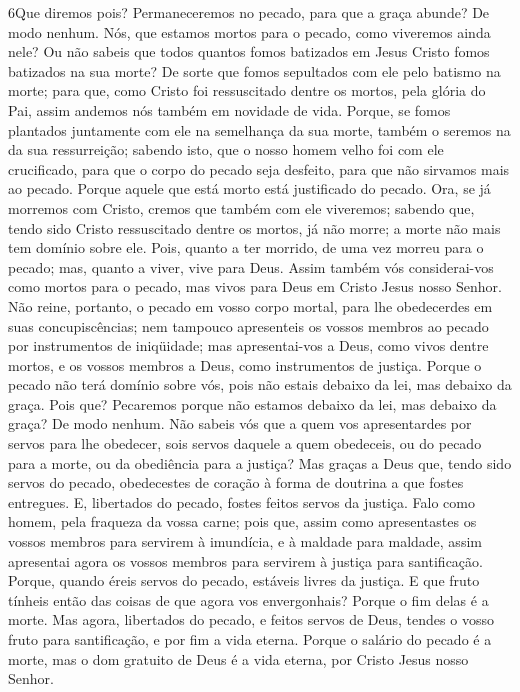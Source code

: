 \medskip

\lettrine{6} Que diremos pois? Permaneceremos no pecado, para
que a graça abunde? De modo nenhum. Nós, que estamos mortos para
o pecado, como viveremos ainda nele? Ou não sabeis que todos
quantos fomos batizados em Jesus Cristo fomos batizados na sua
morte? De sorte que fomos sepultados com ele pelo batismo na
morte; para que, como Cristo foi ressuscitado dentre os mortos, pela
glória do Pai, assim andemos nós também em novidade de vida.
Porque, se fomos plantados juntamente com ele na semelhança da
sua morte, também o seremos na da sua ressurreição; sabendo
isto, que o nosso homem velho foi com ele crucificado, para que o
corpo do pecado seja desfeito, para que não sirvamos mais ao pecado.
Porque aquele que está morto está justificado do pecado.
Ora, se já morremos com Cristo, cremos que também com ele
viveremos; sabendo que, tendo sido Cristo ressuscitado dentre os
mortos, já não morre; a morte não mais tem domínio sobre ele.
Pois, quanto a ter morrido, de uma vez morreu para o pecado;
mas, quanto a viver, vive para Deus. Assim também vós
considerai-vos como mortos para o pecado, mas vivos para Deus em
Cristo Jesus nosso Senhor. Não reine, portanto, o pecado em
vosso corpo mortal, para lhe obedecerdes em suas concupiscências;
nem tampouco apresenteis os vossos membros ao pecado por
instrumentos de iniqüidade; mas apresentai-vos a Deus, como vivos
dentre mortos, e os vossos membros a Deus, como instrumentos de
justiça. Porque o pecado não terá domínio sobre vós, pois não
estais debaixo da lei, mas debaixo da graça. Pois que?
Pecaremos porque não estamos debaixo da lei, mas debaixo da graça?
De modo nenhum. Não sabeis vós que a quem vos apresentardes
por servos para lhe obedecer, sois servos daquele a quem obedeceis,
ou do pecado para a morte, ou da obediência para a justiça?
Mas graças a Deus que, tendo sido servos do pecado,
obedecestes de coração à forma de doutrina a que fostes entregues.
E, libertados do pecado, fostes feitos servos da justiça.
Falo como homem, pela fraqueza da vossa carne; pois que,
assim como apresentastes os vossos membros para servirem à
imundícia, e à maldade para maldade, assim apresentai agora os
vossos membros para servirem à justiça para santificação.
Porque, quando éreis servos do pecado, estáveis livres da
justiça. E que fruto tínheis então das coisas de que agora
vos envergonhais? Porque o fim delas é a morte. Mas agora,
libertados do pecado, e feitos servos de Deus, tendes o vosso fruto
para santificação, e por fim a vida eterna. Porque o salário
do pecado é a morte, mas o dom gratuito de Deus é a vida eterna, por
Cristo Jesus nosso Senhor.

